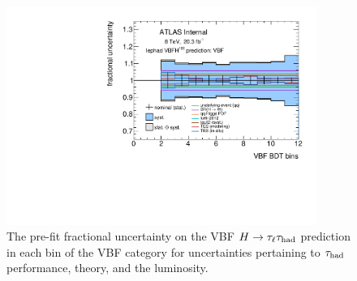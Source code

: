 \begin{figure}[tp]
  \includegraphics[width=0.90\textwidth]{figures/uncertainties/uncertainties_lephad_paper14_8TeV_VBFH125_other_VBF}
  \caption{The pre-fit fractional uncertainty on the VBF $H\rightarrow\tau_\ell\tau_\text{had}$ prediction in each bin of the VBF category for uncertainties pertaining to $\tau_\text{had}$ performance, theory, and the luminosity.}
  \label{fig:backgrounds-uncertainties-vbfother}
\end{figure}

